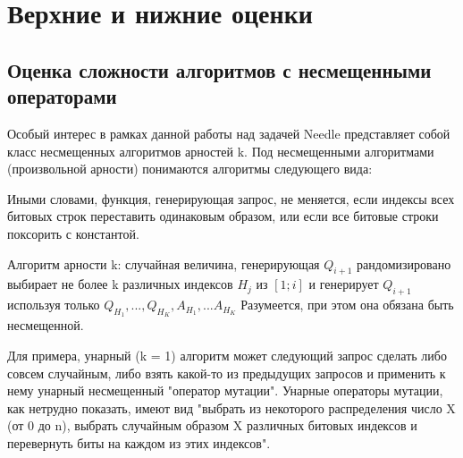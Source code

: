\newcommand{\cupdot}{\mathbin{\mathaccent\cdot\cup}}

\chapter{Верхние и нижние оценки}
\label{chapter3}


\section{Оценка сложности алгоритмов с несмещенными операторами}

Особый интерес в рамках данной работы над задачей Needle представляет собой класс несмещенных алгоритмов арностей k. Под несмещенными алгоритмами (произвольной арности) понимаются алгоритмы
следующего вида:

         
Иными словами, функция, генерирующая запрос, не меняется, если индексы
всех битовых строк переставить одинаковым образом, или если все битовые строки поксорить с константой. 

Алгоритм арности k: случайная величина, генерирующая $Q_{i+1}$ рандомизировано выбирает не более k различных индексов $H_j$ из $[1; i]$ и генерирует $Q_{i+1}$ используя только $Q_{H_1}, ..., Q_{H_K}, A_{H_1}, ... A_{H_K}$ Разумеется, при этом она обязана быть несмещенной.

Для примера, унарный (k = 1) алгоритм может следующий запрос сделать либо совсем случайным, либо взять какой-то из предыдущих запросов и применить к нему унарный несмещенный "оператор мутации". Унарные операторы мутации, как нетрудно показать, имеют вид "выбрать из некоторого распределения число X (от 0 до n), выбрать случайным образом X различных битовых индексов и перевернуть биты на каждом из этих индексов".

